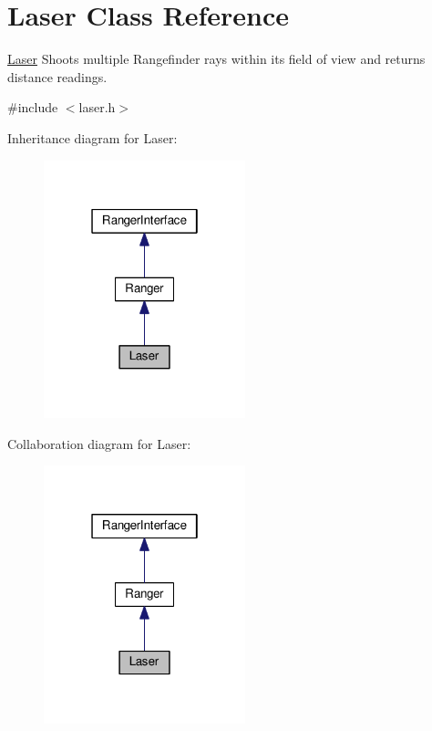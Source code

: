 \hypertarget{class_laser}{}\section{Laser Class Reference}
\label{class_laser}


\hyperlink{class_laser}{Laser} Shoots multiple Rangefinder rays within its field of view and returns distance readings.  




{\ttfamily \#include $<$laser.\+h$>$}



Inheritance diagram for Laser\+:
\nopagebreak
\begin{figure}[H]
\begin{center}
\leavevmode
\includegraphics[width=166pt]{class_laser__inherit__graph}
\end{center}
\end{figure}


Collaboration diagram for Laser\+:
\nopagebreak
\begin{figure}[H]
\begin{center}
\leavevmode
\includegraphics[width=166pt]{class_laser__coll__graph}
\end{center}
\end{figure}

